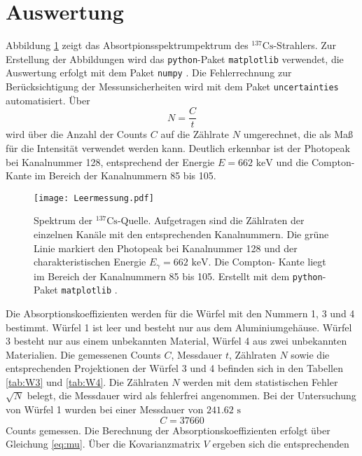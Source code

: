\section{Auswertung}
Abbildung \ref{fig:spektrum} zeigt das Absortpionsspektrumpektrum des ${}^{137}\text{Cs}$-Strahlers.
Zur Erstellung der Abbildungen wird das \texttt{python}-Paket \texttt{matplotlib} \cite{Hunter:2007} verwendet, die Auswertung erfolgt
mit dem Paket \texttt{numpy} \cite{harris2020array}. Die Fehlerrechnung zur Berücksichtigung der Messunsicherheiten wird mit dem Paket \texttt{uncertainties} \cite{uncertainties}
automatisiert.
Über 
\begin{equation*}
    N = \frac{C}{t}
\end{equation*}
wird über die Anzahl der Counts $C$ auf die Zählrate $N$ umgerechnet, die als Maß für die Intensität
verwendet werden kann.
Deutlich erkennbar ist der Photopeak bei Kanalnummer 128, entsprechend der Energie $E= 662 \text{ keV}$ 
und die Compton-Kante im Bereich der Kanalnummern 85 bis 105. 
\begin{figure}
    \centering
    \texttt{[image: Leermessung.pdf]}
    \caption{Spektrum der ${}^{137}\text{Cs}$-Quelle. Aufgetragen sind die Zählraten der einzelnen
    Kanäle mit den entsprechenden Kanalnummern. Die grüne Linie markiert den Photopeak bei  
    Kanalnummer 128 und der charakteristischen Energie $E_\gamma = 662 \text{ keV}$. Die Compton-
    Kante liegt im Bereich der Kanalnummern 85 bis 105. Erstellt mit dem \texttt{python}-Paket \texttt{matplotlib} \cite{Hunter:2007}.}
    \label{fig:spektrum}
\end{figure}
Die Absorptionskoeffizienten werden für die Würfel mit den Nummern 1, 3 und 4 bestimmt. Würfel 1 ist leer und besteht nur aus dem Aluminiumgehäuse.
Würfel 3 besteht nur aus einem unbekannten Material, Würfel 4 aus zwei unbekannten Materialien. 
Die gemessenen Counts $C$, Messdauer $t$, Zählraten $N$ sowie die entsprechenden Projektionen der Würfel 3 und 4 
befinden sich in den Tabellen \ref{tab:W3} und \ref{tab:W4}. Die Zählraten $N$ werden mit dem statistischen Fehler $\sqrt{N}$
belegt, die Messdauer wird als fehlerfrei angenommen.
Bei der Untersuchung von Würfel 1 wurden bei einer Messdauer von $241.62 \text{ s}$ 
\begin{equation*}
    C = 37660
\end{equation*}
Counts gemessen.  
Die Berechnung der Absorptionskoeffizienten erfolgt über Gleichung \ref{eq:mu}. Über die Kovarianzmatrix $V$ ergeben sich die entsprechenden 
